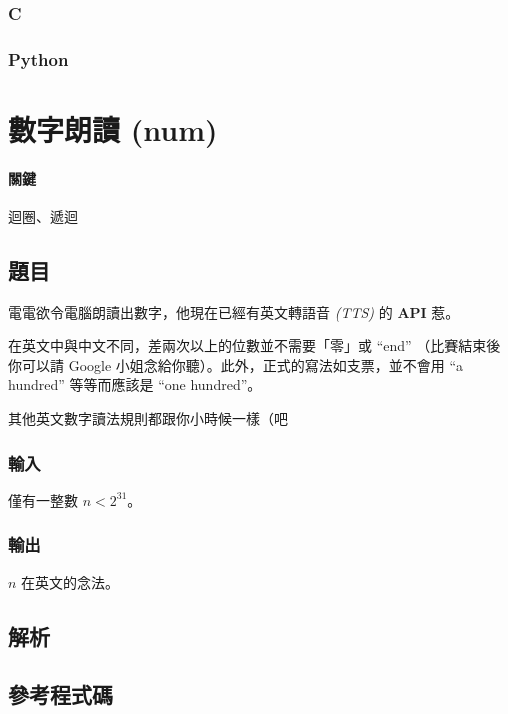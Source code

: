 \documentclass[a4paper,10pt]{article}
\begin{document}
\subsubsection{C}



\subsubsection{Python}



\section{數字朗讀 (num)}

\paragraph{關鍵} 迴圈、遞迴

\subsection{題目}

電電欲令電腦朗讀出數字，他現在已經有英文轉語音 \textit{(TTS)} 的 \textbf{API} 惹。

在英文中與中文不同，差兩次以上的位數並不需要「零」或 ``end'' （比賽結束後你可以請 Google 小姐念給你聽）。此外，正式的寫法如支票，並不會用 ``a hundred'' 等等而應該是 ``one hundred''。

其他英文數字讀法規則都跟你小時候一樣（吧

\subsubsection{輸入}

僅有一整數 $n < 2^{31}$。

\subsubsection{輸出}

$n$ 在英文的念法。

\subsection{解析}

\subsection{參考程式碼}
\end{document}
